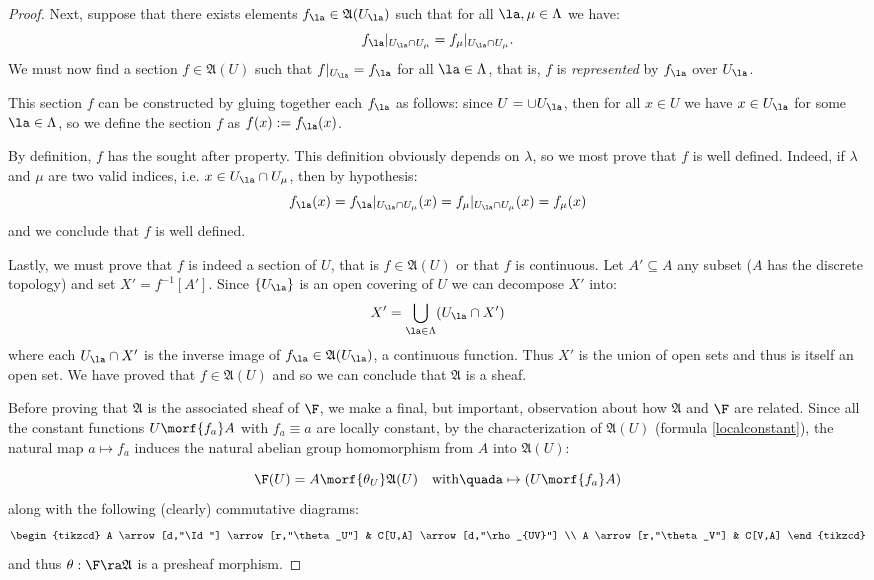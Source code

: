 \begin{proof}
Next, suppose that there exists elements $f_{\la}\in\mathfrak{A}(U_{\la})$
such that for all $\la,\mu\in\Lambda$ we have:
\[
	f_{\la}|_{U_{\la}\cap U_{\mu}}=f_{\mu}|_{U_{\la}\cap U_{\mu}}.
\]
We must now find a section $f\in\mathfrak{A}(U)$ such that $f|_{U_{\la}}=f_{\la}$
for all $\la\in\Lambda$, that is, $f$ is \emph{represented} by $f_{\la}$
over $U_{\la}$.

This section $f$ can be constructed by gluing together each $f_{\la}$
as follows: since $U=\cup U_{\la}$, then for all $x\in U$ we have $x\in U_{\la}$
for some $\la\in\Lambda$, so we define the section $f$ as $f(x):=f_{\la}(x)$.

By definition, $f$ has the sought after property. This definition
obviously depends on $\lambda$, so we most prove that $f$ is well
defined. Indeed, if $\lambda$ and $\mu$ are two valid indices, i.e.
$x\in U_{\la}\cap U_{\mu}$, then by hypothesis:
\[
	f_{\la}(x)=f_{\la}|_{U_{\la}\cap U_{\mu}}(x)= %
	f_{\mu}|_{U_{\la}\cap U_{\mu}}(x)=f_{\mu}(x)
\]
and we conclude that $f$ is well defined.

Lastly, we must prove that $f$ is indeed a section of $U$, that is
$f\in\mathfrak{A}(U)$ or that $f$ is continuous. Let $A'\subseteq A$ any
subset ($A$ has the discrete topology) and set $X'=f^{-1}[A']$. Since
$\{U_{\la}\}$ is an open covering of $U$ we can decompose $X'$ into:
\[
	X'=\bigcup_{\la\in\Lambda} (U_{\la}\cap X')
\]
where each $U_{\la}\cap X'$ is the inverse image of $f_{\la}\in\mathfrak{A}(U_{\la})$,
a continuous function. Thus $X'$ is the union of open sets and thus is
itself an open set. We have proved that $f\in\mathfrak{A}(U)$ and so we
can conclude that $\mathfrak{A}$ is a sheaf.

Before proving that $\mathfrak{A}$ is the associated sheaf of $\F$, we make a
final, but important, observation about how $\mathfrak{A}$ and $\F$ are related.
Since all the constant functions $U\morf{f_a}A$ with $f_a\equiv a$ are locally
constant, by the characterization of $\mathfrak{A}(U)$ (formula \ref{localconstant}),
the natural map $a\mapsto f_a$ induces the natural abelian group homomorphism
from $A$ into $\mathfrak{A}(U)$:

\begin{equation}\label{theta}
	\F(U)=A\morf{\theta_U} \mathfrak{A}(U) \quad\text{with}\quad%
	a\mapsto (U\morf{f_a} A)
\end{equation}
along with the following (clearly) commutative diagrams:
\[
\begin{tikzcd}
A \arrow[d,"\Id"] \arrow[r,"\theta_U"] & C[U,A] \arrow[d,"\rho_{UV}"] \\
A \arrow[r,"\theta_V"]      		 & C[V,A]
\end{tikzcd}
\]
and thus $\theta:\F\ra\mathfrak{A}$ is a presheaf morphism.


\end{proof}
